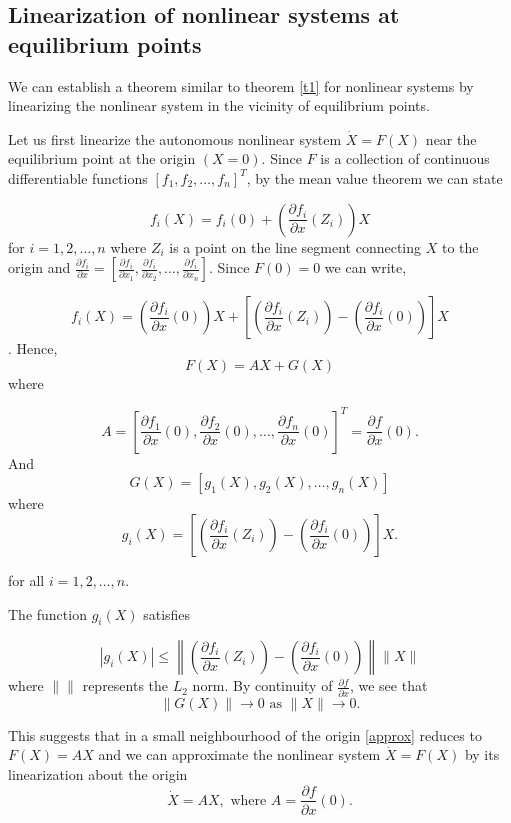 \documentclass{article}
\begin{document}
\subsection{Linearization of nonlinear systems at equilibrium points}
We can establish a theorem similar to theorem \eqref{t1} for nonlinear systems by linearizing the nonlinear system in the vicinity of equilibrium points. 

Let us first linearize the autonomous nonlinear system $\dot{X}=F(X)$ near the equilibrium point at the origin $(X=0).$ Since $F$ is a collection of continuous differentiable functions $[f_1,f_2,\dots,f_n]^T$, by the mean value theorem we can state

$$f_i(X) = f_i(0) + \left(\frac{\partial{f_i}}{\partial{x}}(Z_i)\right)X$$
for $i=1,2,\dots,n$ where $Z_i$ is a point on the line segment connecting $X$ to the origin and $\frac{\partial{f_i}}{\partial{x}} = [\frac{\partial{f_i}}{\partial{x_1}},\frac{\partial{f_i}}{\partial{x_2}},\dots,\frac{\partial{f_i}}{\partial{x_n}}]$. Since $F(0)=0$ we can write,

$$f_i(X) = \left(\frac{\partial{f_i}}{\partial{x}}(0)\right)X+\left[\left(\frac{\partial{f_i}}{\partial{x}}(Z_i)\right) - \left(\frac{\partial{f_i}}{\partial{x}}(0)\right)\right]X$$.
Hence,
\begin{equation}\label{approx}
    F(X) = AX + G(X)
\end{equation}
where

$$A = \left[\frac{\partial{f_1}}{\partial{x}}(0),\frac{\partial{f_2}}{\partial{x}}(0),\dots,\frac{\partial{f_n}}{\partial{x}}(0)\right]^T = \frac{\partial{f}}{\partial{x}}(0).$$
And 
$$G(X) = [g_1(X),g_2(X),\dots,g_n(X)]$$
where
$$g_i(X) = \left[\left(\frac{\partial{f_i}}{\partial{x}}(Z_i)\right) - \left(\frac{\partial{f_i}}{\partial{x}}(0)\right)\right]X.$$

for all $i=1,2,\dots,n.$

The function $g_i(X)$ satisfies

$$|g_i(X)| \leq \left\|\left(\frac{\partial{f_i}}{\partial{x}}(Z_i)\right) - \left(\frac{\partial{f_i}}{\partial{x}}(0)\right)\right\|\|X\|$$
where $\|\|$ represents the $L_2$ norm. By continuity of $\frac{\partial{f}}{\partial{x}}$, we see that
$$\left\|G(X)\right\|\to 0 \text{  as  } \|X\|\to 0.$$

This suggests that in a small neighbourhood of the origin \eqref{approx} reduces to $F(X) = AX$ and we can approximate the nonlinear system $\dot{X}=F(X)$ by its linearization about the origin 
$$\dot{X}=AX, \text{  where  } A=\frac{\partial{f}}{\partial{x}}(0).$$
\end{document}
